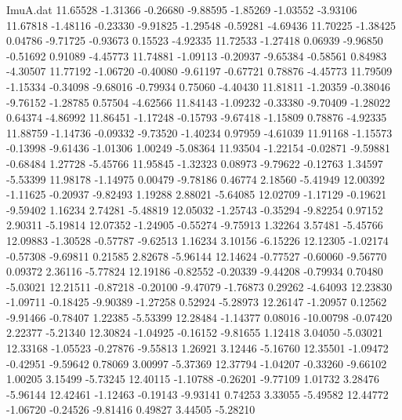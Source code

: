 \begin{filecontents}{ImuA.dat}
  11.65528   -1.31366   -0.26680   -9.88595   -1.85269   -1.03552   -3.93106
  11.67818   -1.48116   -0.23330   -9.91825   -1.29548   -0.59281   -4.69436
  11.70225   -1.38425    0.04786   -9.71725   -0.93673    0.15523   -4.92335
  11.72533   -1.27418    0.06939   -9.96850   -0.51692    0.91089   -4.45773
  11.74881   -1.09113   -0.20937   -9.65384   -0.58561    0.84983   -4.30507
  11.77192   -1.06720   -0.40080   -9.61197   -0.67721    0.78876   -4.45773
  11.79509   -1.15334   -0.34098   -9.68016   -0.79934    0.75060   -4.40430
  11.81811   -1.20359   -0.38046   -9.76152   -1.28785    0.57504   -4.62566
  11.84143   -1.09232   -0.33380   -9.70409   -1.28022    0.64374   -4.86992
  11.86451   -1.17248   -0.15793   -9.67418   -1.15809    0.78876   -4.92335
  11.88759   -1.14736   -0.09332   -9.73520   -1.40234    0.97959   -4.61039
  11.91168   -1.15573   -0.13998   -9.61436   -1.01306    1.00249   -5.08364
  11.93504   -1.22154   -0.02871   -9.59881   -0.68484    1.27728   -5.45766
  11.95845   -1.32323    0.08973   -9.79622   -0.12763    1.34597   -5.53399
  11.98178   -1.14975    0.00479   -9.78186    0.46774    2.18560   -5.41949
  12.00392   -1.11625   -0.20937   -9.82493    1.19288    2.88021   -5.64085
  12.02709   -1.17129   -0.19621   -9.59402    1.16234    2.74281   -5.48819
  12.05032   -1.25743   -0.35294   -9.82254    0.97152    2.90311   -5.19814
  12.07352   -1.24905   -0.55274   -9.75913    1.32264    3.57481   -5.45766
  12.09883   -1.30528   -0.57787   -9.62513    1.16234    3.10156   -6.15226
  12.12305   -1.02174   -0.57308   -9.69811    0.21585    2.82678   -5.96144
  12.14624   -0.77527   -0.60060   -9.56770    0.09372    2.36116   -5.77824
  12.19186   -0.82552   -0.20339   -9.44208   -0.79934    0.70480   -5.03021
  12.21511   -0.87218   -0.20100   -9.47079   -1.76873    0.29262   -4.64093
  12.23830   -1.09711   -0.18425   -9.90389   -1.27258    0.52924   -5.28973
  12.26147   -1.20957    0.12562   -9.91466   -0.78407    1.22385   -5.53399
  12.28484   -1.14377    0.08016  -10.00798   -0.07420    2.22377   -5.21340
  12.30824   -1.04925   -0.16152   -9.81655    1.12418    3.04050   -5.03021
  12.33168   -1.05523   -0.27876   -9.55813    1.26921    3.12446   -5.16760
  12.35501   -1.09472   -0.42951   -9.59642    0.78069    3.00997   -5.37369
  12.37794   -1.04207   -0.33260   -9.66102    1.00205    3.15499   -5.73245
  12.40115   -1.10788   -0.26201   -9.77109    1.01732    3.28476   -5.96144
  12.42461   -1.12463   -0.19143   -9.93141    0.74253    3.33055   -5.49582
  12.44772   -1.06720   -0.24526   -9.81416    0.49827    3.44505   -5.28210

\end{filecontents}
